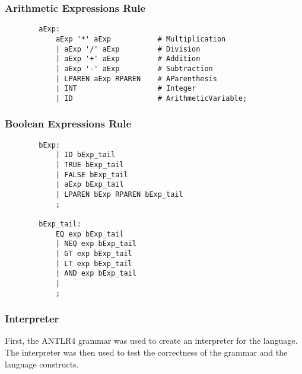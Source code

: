 \documentclass{beamer}
\begin{document}
\begin{frame}[fragile]
    \frametitle{Arithmetic Expressions Rule}
    \scriptsize
    \begin{verbatim}
        aExp:
            aExp '*' aExp           # Multiplication
            | aExp '/' aExp         # Division
            | aExp '+' aExp         # Addition
            | aExp '-' aExp         # Subtraction
            | LPAREN aExp RPAREN    # AParenthesis
            | INT                   # Integer
            | ID                    # ArithmeticVariable;
    \end{verbatim}
\end{frame}

\begin{frame}[fragile]
    \frametitle{Boolean Expressions Rule}
    \scriptsize
    \begin{verbatim}        
        bExp:
            | ID bExp_tail
            | TRUE bExp_tail
            | FALSE bExp_tail
            | aExp bExp_tail
            | LPAREN bExp RPAREN bExp_tail
            ;

        bExp_tail:
            EQ exp bExp_tail
            | NEQ exp bExp_tail
            | GT exp bExp_tail
            | LT exp bExp_tail
            | AND exp bExp_tail
            |
            ;
    \end{verbatim}
\end{frame}


\begin{frame}\frametitle{Interpreter}
    First, the ANTLR4 grammar was used to create an interpreter for the language. The interpreter was then used to test the correctness of the grammar and the language constructs.
\end{frame}
\end{document}
